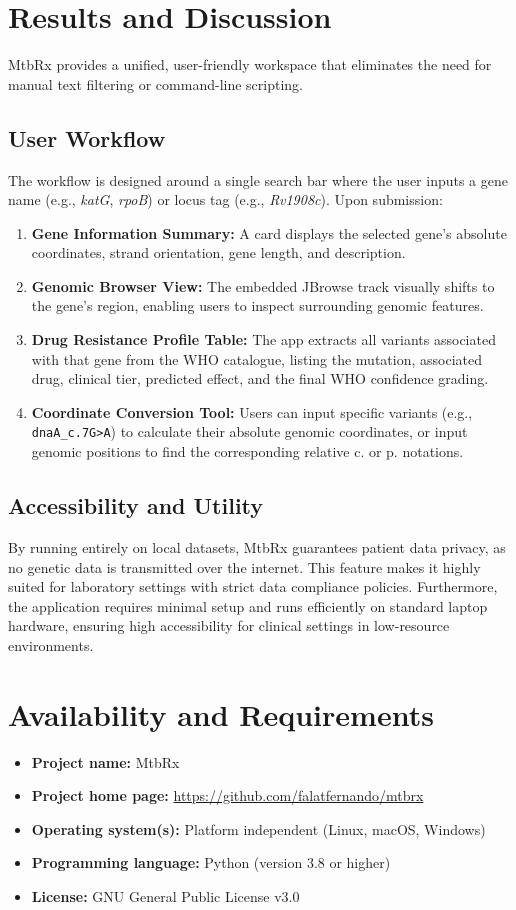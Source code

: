 \documentclass{article}
\begin{document}
\section{Results and Discussion}
MtbRx provides a unified, user-friendly workspace that eliminates the need for manual text filtering or command-line scripting. 

\subsection{User Workflow}
The workflow is designed around a single search bar where the user inputs a gene name (e.g., \textit{katG}, \textit{rpoB}) or locus tag (e.g., \textit{Rv1908c}). Upon submission:
\begin{enumerate}
    \item \textbf{Gene Information Summary:} A card displays the selected gene's absolute coordinates, strand orientation, gene length, and description.
    \item \textbf{Genomic Browser View:} The embedded JBrowse track visually shifts to the gene's region, enabling users to inspect surrounding genomic features.
    \item \textbf{Drug Resistance Profile Table:} The app extracts all variants associated with that gene from the WHO catalogue, listing the mutation, associated drug, clinical tier, predicted effect, and the final WHO confidence grading.
    \item \textbf{Coordinate Conversion Tool:} Users can input specific variants (e.g., \texttt{dnaA\_c.7G\textgreater{}A}) to calculate their absolute genomic coordinates, or input genomic positions to find the corresponding relative c. or p. notations.
\end{enumerate}

\subsection{Accessibility and Utility}
By running entirely on local datasets, MtbRx guarantees patient data privacy, as no genetic data is transmitted over the internet. This feature makes it highly suited for laboratory settings with strict data compliance policies. Furthermore, the application requires minimal setup and runs efficiently on standard laptop hardware, ensuring high accessibility for clinical settings in low-resource environments. 

\section{Availability and Requirements}
\begin{itemize}
    \item \textbf{Project name:} MtbRx
    \item \textbf{Project home page:} \url{https://github.com/falatfernando/mtbrx}
    \item \textbf{Operating system(s):} Platform independent (Linux, macOS, Windows)
    \item \textbf{Programming language:} Python (version 3.8 or higher)
    \item \textbf{License:} GNU General Public License v3.0
\end{itemize}
\end{document}
